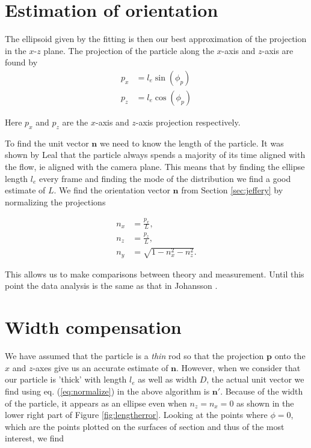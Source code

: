 \section{Estimation of orientation}

The ellipsoid given by the fitting is then our best approximation of the projection in the $x$-$z$ plane. The projection of the particle along the $x$-axis and $z$-axis are found by
\begin{align} \label{eq:project}
p_x  &= l_e \sin(\phi_p) \\
p_z  &= l_e \cos(\phi_p) 
\end{align}

Here $p_x$ and $p_z$ are the $x$-axis and $z$-axis projection respectively.

To find the unit vector $\mathbf{n}$ we need to know the length of the particle. It was shown by Leal \cite{Leal} that the particle always spends a majority of its time aligned with the flow, ie aligned with the camera plane. This means that by finding the ellipse length $l_e$ every frame and finding the mode of the distribution we find a good estimate of $L$. We find the orientation vector $\mathbf{n}$ from Section \ref{sec:jeffery} by normalizing the projections

\begin{subequations}\label{eq:normalize}
\begin{align}
n_x 	&= \frac{p_x}{L}, \\
n_z 	&= \frac{p_z}{L}, \\
n_y		&= \sqrt{1 - n_x^2 - n_z^2}.
\end{align}
\end{subequations}

This allows us to make comparisons between theory and measurement. Until this point the data analysis is the same as that in Johansson \cite{AntonThesis}.

\section{Width compensation}\label{sec:width_compensation}
We have assumed that the particle is a \emph{thin} rod so that the projection $\mathbf{p}$ onto the $x$ and $z$-axes give us an accurate estimate of $\mathbf{n}$. However, when we consider that our particle is 'thick' with length $l_e$ as well as width $D$, the actual unit vector we find using eq. (\ref{eq:normalize}) in the above algorithm is $\mathbf{n}'$. Because of the width of the particle, it appears as an ellipse even when $n_z = n_x = 0$ as shown in the lower right part of Figure \ref{fig:lengtherror}. Looking at the points where $\phi = 0$, which are the points plotted on the surfaces of section and thus of the most interest, we find

